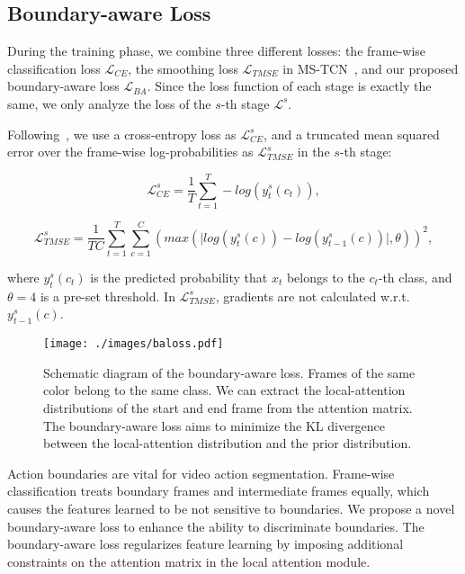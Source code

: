 \documentclass[letterpaper]{article} \usepackage[submission]{aaai23}  \usepackage{times}  \usepackage{helvet}  \usepackage{courier}  \usepackage[hyphens]{url}  \usepackage{graphicx} \urlstyle{rm} \def\UrlFont{\rm}  \usepackage{natbib}  \usepackage{caption} \frenchspacing  \setlength{\pdfpagewidth}{8.5in} \setlength{\pdfpageheight}{11in} \usepackage{algorithm}
\begin{document}
\subsection{Boundary-aware Loss}During the training phase, we combine three different losses: the frame-wise classification loss $\mathcal{L}_{CE}$, the smoothing loss $\mathcal{L}_{TMSE}$ in MS-TCN~\cite{farha2019ms}, and our proposed boundary-aware loss $\mathcal{L}_{BA}$. Since the loss function of each stage is exactly the same, we only analyze the loss of the $s$-th stage $\mathcal{L}^s$. 

Following~\cite{farha2019ms}, we use a cross-entropy loss as $\mathcal{L}_{CE}^s$, and a truncated mean squared error over the frame-wise log-probabilities as $\mathcal{L}_{TMSE}^s$ in the $s$-th stage:
\begin{small}
\begin{equation}
\label{eq:celoss}
\mathcal{L}_{CE}^s = \frac{1}{T} \sum\limits_{t = 1}^T -log({y}^s_t(c_t)), 
\end{equation}
\end{small}
\begin{small}
\begin{equation}
\label{eq:tmseloss} 
\mathcal{L}_{TMSE}^s = \frac{1}{TC} \sum\limits_{t = 1}^T \sum\limits_{c = 1}^C (max(\lvert log({y}^s_t(c)) - log({y}^s_{t-1}(c)) \rvert,\theta))^2,
\end{equation}
\end{small}
where \({y}^s_t(c_t)\) is the predicted probability that \({x}_t\) belongs to the \(c_t\)-th class, and \(\theta=4\) is a pre-set threshold. In $\mathcal{L}_{TMSE}^s$, gradients are not calculated w.r.t. \({y}^s_{t-1}(c)\).


\begin{figure}[t]
\centering
\texttt{[image: ./images/baloss.pdf]} \caption{Schematic diagram of the boundary-aware loss. Frames of the same color belong to the same class. We can extract the local-attention distributions of the start and end frame from the attention matrix. The boundary-aware loss aims to minimize the KL divergence between the local-attention distribution and the prior distribution.}
\label{fig:BALoss}
\end{figure}


Action boundaries are vital for video action segmentation. Frame-wise classification treats boundary frames and intermediate frames equally, which causes the features learned to be not sensitive to boundaries. We propose a novel boundary-aware loss to enhance the ability to discriminate boundaries. The boundary-aware loss regularizes feature learning by imposing additional constraints on the attention matrix in the local attention module.
\end{document}
